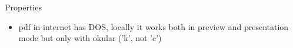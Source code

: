 \documentclass{beamer}
\begin{document}
\begin{frame}{Properties}

\begin{itemize}
\item pdf in internet has DOS, locally it works both in preview and
  presentation mode but only with okular  ('k', not 'c')
\end{itemize}
\end{frame} 
\end{document}
